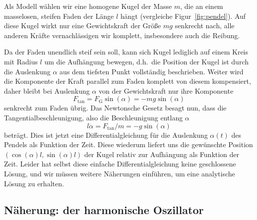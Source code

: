 Als Modell wählen wir eine homogene Kugel der Masse $m$, die an einem
masselosen, steifen Faden der Länge $l$ hängt (vergleiche
Figur~\ref{fig:pendel}). Auf diese Kugel wirkt nur eine Gewichtskraft
der Größe $mg$ senkrecht nach, alle anderen Kräfte vernachlässigen wir
komplett, insbesondere auch die Reibung.

Da der Faden unendlich steif sein soll, kann sich Kugel lediglich auf
einem Kreis mit Radius $l$ um die Aufhängung bewegen, d.h.\ die
Position der Kugel ist durch die Auslenkung $\alpha$ aus dem tiefsten
Punkt vollständig beschrieben. Weiter wird die Komponente der Kraft
parallel zum Faden komplett von diesem kompensiert, daher bleibt bei
Auslenkung $\alpha$ von der Gewichtskraft nur ihre Komponente
\begin{equation}
  F_\text{tan} = F_\text{G}\sin(\alpha) = -mg\sin(\alpha)
\end{equation}
senkrecht zum Faden übrig. Das Newtonsche Gesetz besagt nun, dass
die Tangentialbeschleunigung, also die Beschleunigung entlang $\alpha$
\begin{equation}
  l\ddot\alpha = F_\text{tan}/m = -g\sin(\alpha)
  \label{eq:pendelgln}
\end{equation}
beträgt. Dies ist jetzt eine Differentialgleichung für die Auslenkung
$\alpha(t)$ des Pendels als Funktion der Zeit. Diese wiederum liefert
uns die gewünschte Position $(\cos(\alpha)l,\sin(\alpha)l)$ der Kugel
relativ zur Aufhängung als Funktion der Zeit. Leider hat selbst diese
einfache Differentialgleichung keine geschlossene Lösung, und wir
müssen weitere Näherungen einführen, um eine analytische Lösung zu
erhalten.

\subsection{Näherung: der harmonische Oszillator}

